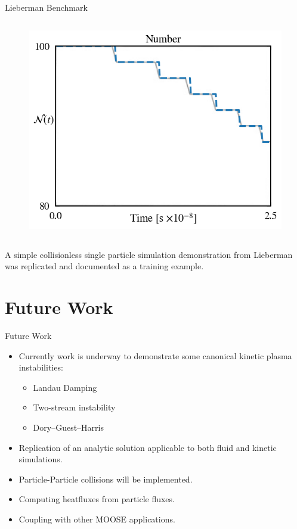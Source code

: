 \documentclass[aspectratio=169, 16pt]{beamer}
\begin{document}
\begin{frame}{Lieberman Benchmark}
\begin{columns}
\begin{figure}[H]
      \includegraphics[width=\textwidth]{figs/lieberman_population_comparison.png}
    \end{figure}
  \end{columns}
    A simple collisionless single particle simulation demonstration from Lieberman\cite{lieberman2005} was replicated and documented as a training example.
\end{frame}

\section{Future Work}
\begin{frame}{Future Work} 
  \vfill{}
  \begin{itemize}
    \item Currently work is underway to demonstrate some canonical kinetic plasma instabilities:
    \begin{itemize}
      \item Landau Damping
      \item Two-stream instability
      \item Dory–Guest–Harris
    \end{itemize}
    \item Replication of an analytic solution applicable to both fluid and kinetic simulations\cite{lafleur2022space}.
    \item Particle-Particle collisions will be implemented.
    \item Computing heatfluxes from particle fluxes.
    \item Coupling with other MOOSE applications.
  \end{itemize}
\end{frame}
\end{document}
